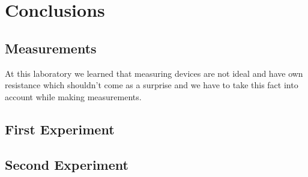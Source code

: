 \section{Conclusions}

\subsection{Measurements}


At this laboratory we learned that measuring devices are not ideal and have own resistance which shouldn’t come as a surprise and we have to take this fact into account while making measurements. 
\subsection{First Experiment}



\subsection{Second Experiment}

